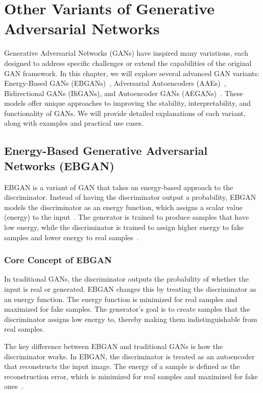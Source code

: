 \chapter{Other Variants of Generative Adversarial Networks}
Generative Adversarial Networks (GANs) have inspired many variations, each designed to address specific challenges or extend the capabilities of the original GAN framework. In this chapter, we will explore several advanced GAN variants: Energy-Based GANs (EBGANs)~\cite{zhao2016energy}, Adversarial Autoencoders (AAEs)~\cite{makhzani2015adversarial}, Bidirectional GANs (BiGANs), and Autoencoder GANs (AEGANs)~\cite{donahue2016adversarial}. These models offer unique approaches to improving the stability, interpretability, and functionality of GANs. We will provide detailed explanations of each variant, along with examples and practical use cases.

\section{Energy-Based Generative Adversarial Networks (EBGAN)}
EBGAN is a variant of GAN that takes an energy-based approach to the discriminator. Instead of having the discriminator output a probability, EBGAN models the discriminator as an energy function, which assigns a scalar value (energy) to the input~\cite{zhao2016energy}. The generator is trained to produce samples that have low energy, while the discriminator is trained to assign higher energy to fake samples and lower energy to real samples~\cite{zhang2019self}.

\subsection{Core Concept of EBGAN}
In traditional GANs, the discriminator outputs the probability of whether the input is real or generated. EBGAN changes this by treating the discriminator as an energy function. The energy function is minimized for real samples and maximized for fake samples. The generator's goal is to create samples that the discriminator assigns low energy to, thereby making them indistinguishable from real samples.

The key difference between EBGAN and traditional GANs is how the discriminator works. In EBGAN, the discriminator is treated as an autoencoder that reconstructs the input image. The energy of a sample is defined as the reconstruction error, which is minimized for real samples and maximized for fake ones~\cite{zhao2016energy}.

